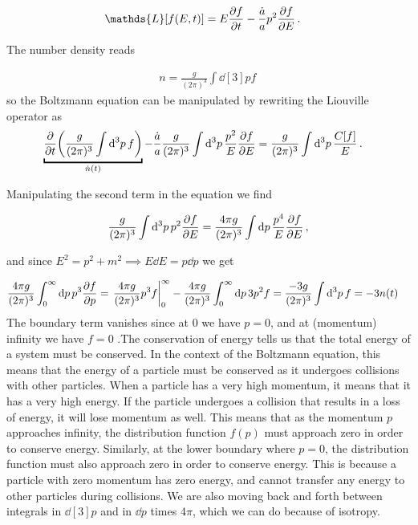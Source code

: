 \begin{appendices}
\begin{align}
    \mathds{L}[f(E, t)] &= E \pdv{f}{t} - \frac{\dot{a}}{a} p^2 \pdv{f}{E}\,.\label{eq:A.6}
\end{align}

The number density reads 

\begin{align}
    n = \frac{g}{(2 \pi )^3} \int \dd[3]{p} f\,\label{eq:A.7}
\end{align}
%
so the Boltzmann equation can be manipulated by rewriting the Liouville operator as 
%
\begin{align}
    \underbracket{\pdv{}{t} \qty( \frac{g}{(2 \pi )^3} \int \dd[3]{p} f)}_{\dot{n}(t)} - \frac{\dot{a}}{a} \frac{g}{(2 \pi )^3}\int \dd[3]{p} \frac{p^2}{E} \pdv{f}{E} &= \frac{g}{(2 \pi )^3} \int \dd[3]{p} \frac{C[f]}{E}\,.\label{eq:A.8}
\end{align}


Manipulating the second term in the equation we find

\begin{align}
    \frac{g}{(2 \pi )^3} \int \dd[3]{p} p^2 \pdv{f}{E} = \frac{4 \pi g}{(2 \pi )^3} \int \dd{p} \frac{p^{4}}{E} \pdv{f}{E}  \,,\label{eq:A.9}
\end{align}

and since \(E^2 = p^2 + m^2 \implies E \dd{E} =p \dd{p}\) we get 

\begin{align}
    \frac{4 \pi g}{(2 \pi )^3} \int_{0}^{ \infty } \dd{p} p^3 \pdv{f}{p}
  &= \eval{\frac{4 \pi g}{(2 \pi )^3} p^3 f}_{0}^{\infty } - \frac{4 \pi g}{(2 \pi )^3}\int_{0}^{\infty } \dd{p} 3 p^2 f 
  = \frac{-3 g}{(2 \pi )^3} \int \dd[3]{p} f = -3n(t) \label{eq:A.10}
\end{align}
The boundary term vanishes since at \(0\) we have \(p=0\), and at (momentum) infinity we have \(f=0\) .The conservation of energy tells us that the total energy of a system must be conserved. In the context of the Boltzmann equation, this means that the energy of a particle must be conserved as it undergoes collisions with other particles.
When a particle has a very high momentum, it means that it has a very high energy. If the particle undergoes a collision that results in a loss of energy, it will lose momentum as well. This means that as the momentum $p$ approaches infinity, the distribution function $f(p)$ must approach zero in order to conserve energy.
Similarly, at the lower boundary where $p = 0$, the distribution function must also approach zero in order to conserve energy. This is because a particle with zero momentum has zero energy, and cannot transfer any energy to other particles during collisions. We are also moving back and forth between integrals in \(\dd[3]{p}\) and in \(\dd{p}\) times \(4 \pi \), which we can do because of isotropy.


\end{appendices}
